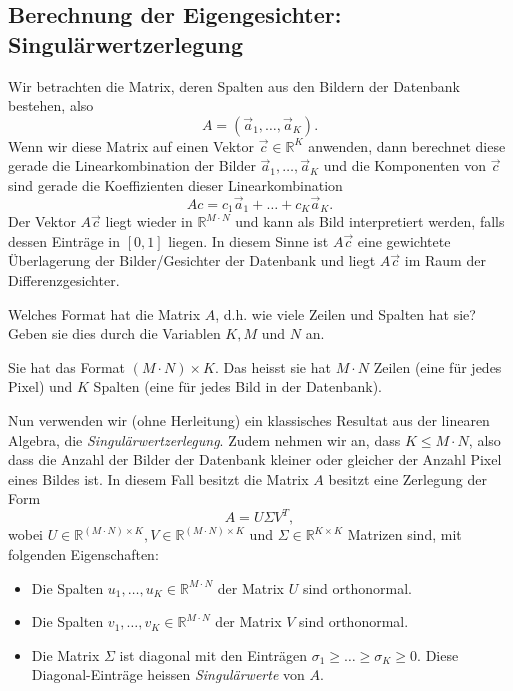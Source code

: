 \subsection{Berechnung der Eigengesichter: Singulärwertzerlegung}
Wir betrachten die Matrix, deren Spalten aus den Bildern der Datenbank bestehen, also
\begin{equation*}
	A=\left(\vec a_1,\ldots,\vec a_K\right).
\end{equation*}
Wenn wir diese Matrix auf einen Vektor $\vec c\in\mathbb R^K$ anwenden, dann berechnet diese gerade die Linearkombination der Bilder $\vec a_1,\ldots,\vec a_K$ und die Komponenten von $\vec c$ sind gerade die Koeffizienten dieser Linearkombination
\begin{equation*}
	Ac=c_1\vec a_1+\ldots+c_K\vec a_K.
\end{equation*}
Der Vektor $A\vec c$ liegt wieder in $\mathbb R^{M\cdot N}$ und kann als Bild interpretiert werden, falls dessen Einträge in $\left[0,1\right]$ liegen.
In diesem Sinne ist $A\vec c$ eine gewichtete Überlagerung der Bilder/Gesichter der Datenbank und liegt $A\vec c$ im Raum der Differenzgesichter.
\begin{aufgabe}
	Welches Format hat die Matrix $A$, d.h. wie viele Zeilen und Spalten hat sie?
	Geben sie dies durch die Variablen $K,M$ und $N$ an. 
\end{aufgabe}
\begin{losung*}
	Sie hat das Format $\left(M\cdot N\right)\times K$.
	Das heisst sie hat $M\cdot N$ Zeilen (eine für jedes Pixel) und $K$ Spalten (eine für jedes Bild in der Datenbank).
\end{losung*}
Nun verwenden wir (ohne Herleitung) ein klassisches Resultat aus der linearen Algebra, die \textit{Singulärwertzerlegung}.
Zudem nehmen wir an, dass $K\leq M\cdot N$, also dass die Anzahl der Bilder der Datenbank kleiner oder gleicher der Anzahl Pixel eines Bildes ist.
In diesem Fall besitzt die Matrix $A$ besitzt eine Zerlegung der Form
\begin{equation*}
	A=U\Sigma V^T,
\end{equation*}
wobei $U\in\mathbb R^{\left(M\cdot N\right)\times K},V\in\mathbb R^{\left(M\cdot N\right)\times K}$ und $\Sigma\in\mathbb R^{K\times K}$ Matrizen sind, mit folgenden Eigenschaften:
\begin{itemize}
	\item Die Spalten $u_1,\ldots,u_K\in\mathbb R^{M\cdot N}$ der Matrix $U$ sind orthonormal.
	\item Die Spalten $v_1,\ldots,v_K\in\mathbb R^{M\cdot N}$ der Matrix $V$ sind orthonormal.
	\item Die Matrix $\Sigma$ ist diagonal mit den Einträgen $\sigma_1\geq\ldots\geq\sigma_K\geq 0$.
	Diese Diagonal-Einträge heissen \textit{Singulärwerte} von $A$.
\end{itemize}
